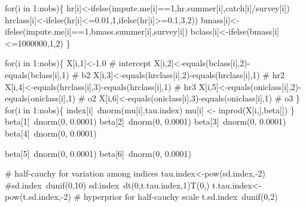 \documentclass[]{elsarticle} %
\newenvironment{Shaded}{\begin{snugshade}}{\end{snugshade}}
\newcommand{\StringTok}[1]{\textcolor[rgb]{0.31,0.60,0.02}{#1}}
\begin{document}
\begin{Shaded}
\begin{Highlighting}[numbers=left,,]
{{\StringTok{    for(i in 1:nobs)\{}
\StringTok{      hr[i]<-ifelse(impute.me[i]==1,hr.summer[i],catch[i]/survey[i])}
\StringTok{      hrclass[i]<-ifelse(hr[i]<=0.01,1,ifelse(hr[i]>=0.1,3,2))}
\StringTok{      bmass[i]<-ifelse(impute.me[i]==1,bmass.summer[i],survey[i])}
\StringTok{      bclass[i]<-ifelse(bmass[i]<=1000000,1,2) }
\StringTok{    \}}

\StringTok{   }
\StringTok{    for(i in 1:nobs)\{}
\StringTok{      X[i,1]<-1.0     # intercept}
\StringTok{      X[i,2]<-equals(bclass[i],2)-equals(bclass[i],1) # b2}
\StringTok{      X[i,3]<-equals(hrclass[i],2)-equals(hrclass[i],1) # hr2}
\StringTok{      X[i,4]<-equals(hrclass[i],3)-equals(hrclass[i],1) # hr3}
\StringTok{      X[i,5]<-equals(oniclass[i],2)-equals(oniclass[i],1) # o2}
\StringTok{      X[i,6]<-equals(oniclass[i],3)-equals(oniclass[i],1) # o3}
\StringTok{    \}}
\StringTok{  }
\StringTok{ }
\StringTok{    for(i in 1:nobs)\{}
\StringTok{      index[i]~dnorm(mu[i],tau.index)}
\StringTok{      mu[i] <- inprod(X[i,],beta[])}
\StringTok{    \}}
\StringTok{    }
\StringTok{    beta[1]~dnorm(0, 0.0001)}
\StringTok{    }
\StringTok{    beta[2]~dnorm(0, 0.0001)}
\StringTok{    }
\StringTok{    beta[3]~dnorm(0, 0.0001)}
\StringTok{    beta[4]~dnorm(0, 0.0001)}

\StringTok{    beta[5]~dnorm(0, 0.0001)}
\StringTok{    beta[6]~dnorm(0, 0.0001)}
\StringTok{    }

\StringTok{    # half-cauchy for variation among indices}
\StringTok{    tau.index<-pow(sd.index,-2)}
\StringTok{    #sd.index~dunif(0,10)}
\StringTok{    sd.index~dt(0,t.tau.index,1)T(0,)}
\StringTok{    t.tau.index<-pow(t.sd.index,-2)}
\StringTok{    # hyperprior for half-cauchy scale}
\StringTok{    t.sd.index~dunif(0,2)}

}}
\end{Highlighting}
\end{Shaded}
\end{document}
